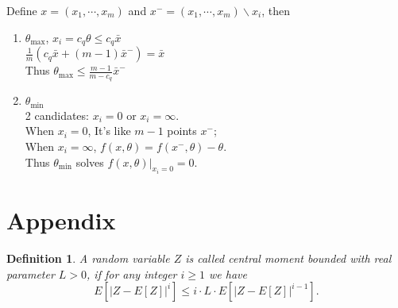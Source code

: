 \documentclass[a4paper]{article}
\newtheorem{definition}[fact]{Definition}
\begin{document}
Define $x = (x_1, \cdots, x_m)$ and $x^- = (x_1, \cdots, x_m) \backslash x_i$, then
\begin{enumerate}
\item $\theta_{\mathrm{max}}$,
$x_i = c_q \theta \le c_q \bar{x}$ \\
$\frac{1}{m} \left( c_q \bar{x} + (m-1) \bar{x}^- \right) = \bar{x}$ \\
Thus $\theta_{\mathrm{max}} \le \frac{m-1}{m-c_q} \bar{x}^-$
\item $\theta_{\mathrm{min}}$ \\
2 candidates: $x_i = 0$ or $x_i = \infty$.\\
When $x_i = 0$, It's like $m-1$ points $x^-$; \\
When $x_i = \infty$, $f(x,\theta) = f(x^-, \theta) - \theta$. \\
Thus $\theta_{\mathrm{min}}$ solves $f(x,\theta)|_{x_i = 0} = 0$.
\end{enumerate}



\section{Appendix}
\begin{definition}
\label{def:CentralMomentBounded}
A random variable $Z$ is called central moment bounded with real parameter $L > 0$,
if for any integer $i \ge 1$ we have
\[
	E\left[ \left| Z - E[Z] \right|^i \right] \le
    i \cdot L \cdot E\left[ \left| Z - E[Z] \right|^{i-1} \right].
\]
\end{definition}



{}

\end{document}
